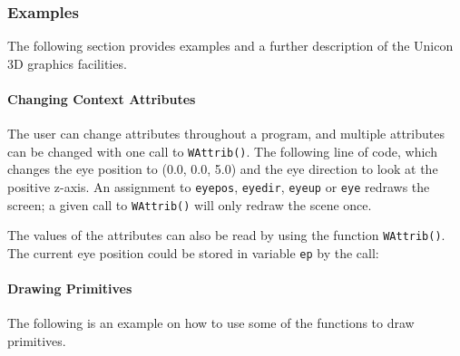 \subsubsection{Examples}

The following section provides examples and a further description of the
Unicon 3D graphics facilities. 

\paragraph{Changing Context Attributes}
The user can change attributes throughout a program, and multiple
attributes can be changed with one call to \texttt{WAttrib()}.
The following line of code, which changes the eye
position to (0.0, 0.0, 5.0) and the eye direction to look at the
positive z-axis. An assignment to \texttt{eyepos}, \texttt{eyedir},
\texttt{eyeup} or \texttt{eye}
redraws the screen; a given call to \texttt{WAttrib()} will only redraw the
scene once.


The values of the attributes can also be read by using the function
\texttt{WAttrib()}. The current eye position could be stored in variable
\texttt{ep} by the call:


\paragraph{Drawing Primitives}
The following is an example on how to use some of the functions to draw
primitives. 


